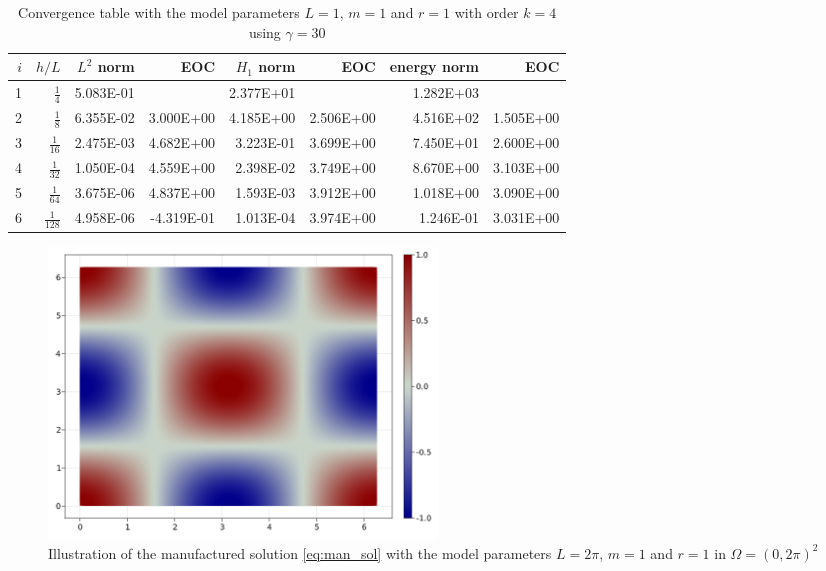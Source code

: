 \begin{table}
  \caption{\label{tab:ex1_order:c}Convergence table with the model parameters $L=1$, $m=1$ and $r=1$ with order $k=4$ using $ \gamma = 30$ }
  \begin{tabular}{rrrrrrrr}
    \hline\hline
    $i$&\textbf{$h/{L} $} & \textbf{$L^2$ norm} & \textbf{EOC} & \textbf{$H_1$ norm} & \textbf{EOC} & \textbf{energy norm} & \textbf{EOC} \\\hline
    1&$\frac{1}{4}$ & 5.083E-01 &  & 2.377E+01 &  & 1.282E+03 &  \\
    2&$\frac{1}{8}$ & 6.355E-02 & 3.000E+00 & 4.185E+00 & 2.506E+00 & 4.516E+02 & 1.505E+00 \\
    3&$\frac{1}{16}$ & 2.475E-03 & 4.682E+00 & 3.223E-01 & 3.699E+00 & 7.450E+01 & 2.600E+00 \\
    4&$\frac{1}{32}$ & 1.050E-04 & 4.559E+00 & 2.398E-02 & 3.749E+00 & 8.670E+00 & 3.103E+00 \\
    5&$\frac{1}{64}$ & 3.675E-06 & 4.837E+00 & 1.593E-03 & 3.912E+00 & 1.018E+00 & 3.090E+00 \\
    6&$\frac{1}{128}$ & 4.958E-06 & -4.319E-01 & 1.013E-04 & 3.974E+00 & 1.246E-01 & 3.031E+00 \\\hline\hline
  \end{tabular}
\end{table}

\newpage

\begin{figure}[tbh!]
    \centering
    \includegraphics[width=0.5\textwidth]{figures/model/l_6.28_m_1_r_1n_100_sol.png}
    \caption{Illustration of the manufactured solution \eqref{eq:man_sol} with the model parameters $L=2\pi$, $m=1$ and $r=1$ in $\Omega = (0,2\pi)^2$}
    \label{fig:sol_l2pi_m1_r1}
\end{figure}


